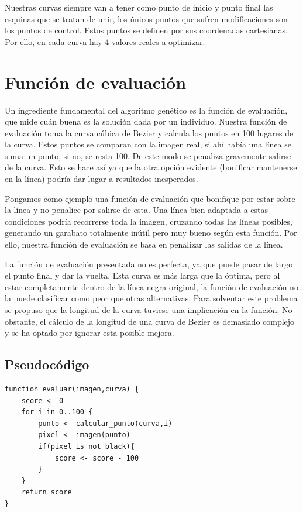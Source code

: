 \documentclass{report}
\begin{document}
Nuestras curvas siempre van a tener como punto de inicio y punto final las esquinas que se tratan de unir, los únicos
puntos que sufren modificaciones son los puntos de control. Estos puntos se definen por sus coordenadas cartesianas. Por ello, en cada curva hay 4 valores reales a optimizar.

\section{Función de evaluación}

Un ingrediente fundamental del algoritmo genético es la función de evaluación, que mide cuán buena
es la solución dada por un individuo. Nuestra función de evaluación toma la curva cúbica de Bezier y 
calcula
los puntos en 100 lugares de la curva. Estos puntos se comparan con la imagen real, si ahí había una línea
se suma un punto, si no, se resta 100. De este modo se penaliza gravemente salirse de la curva. Esto se hace así ya que la otra opción
evidente (bonificar mantenerse en la línea) podría dar lugar a resultados inesperados. 

Pongamos como ejemplo una función de evaluación que bonifique por estar sobre la línea y no penalice por salirse de esta. Una línea bien adaptada a estas condiciones podría recorrerse toda la imagen, cruzando todas las líneas posibles, generando un garabato totalmente inútil pero muy bueno según esta función. Por ello, nuestra función de evaluación se basa en penalizar las salidas de la línea.

La función de evaluación presentada no es perfecta, ya que puede pasar de largo el punto final y dar la vuelta. Esta curva es más larga que la óptima, pero al estar completamente dentro de la línea negra original, la función de evaluación no la puede clasificar como peor que otras alternativas.
Para solventar este problema se propuso que la longitud de la curva tuviese una implicación en la función. No obstante, el cálculo de la longitud de
una curva de Bezier es demasiado complejo y se ha optado por ignorar esta posible mejora.

\subsection{Pseudocódigo}

\begin{lstlisting}
function evaluar(imagen,curva) {
	score <- 0
	for i in 0..100 {
		punto <- calcular_punto(curva,i)
		pixel <- imagen(punto)
		if(pixel is not black){
			score <- score - 100
		}
	}
	return score
}
\end{lstlisting}
\end{document}
